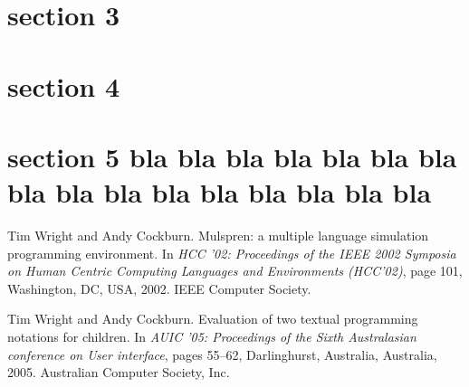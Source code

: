 \documentclass[12pt]{report}
\begin{document}
\section{section 3}
\section{section 4}
\section{section 5 bla bla bla bla bla bla bla bla bla bla bla
bla bla bla bla bla}
\begin{thebibliography}{1}
Tim Wright and Andy Cockburn.
\newblock Mulspren: a multiple language simulation programming
  environment.
\newblock In {\em HCC '02: Proceedings of the IEEE 2002 Symposia
  on Human Centric Computing Languages and Environments (HCC'02)},
  page 101, Washington, DC, USA, 2002. IEEE Computer Society.

Tim Wright and Andy Cockburn.
\newblock Evaluation of two textual programming notations for children.
\newblock In {\em AUIC '05: Proceedings of the Sixth Australasian
  conference on User interface}, pages 55--62, Darlinghurst, Australia,
  Australia, 2005.
  Australian Computer Society, Inc.
\end{thebibliography}
\end{document}
